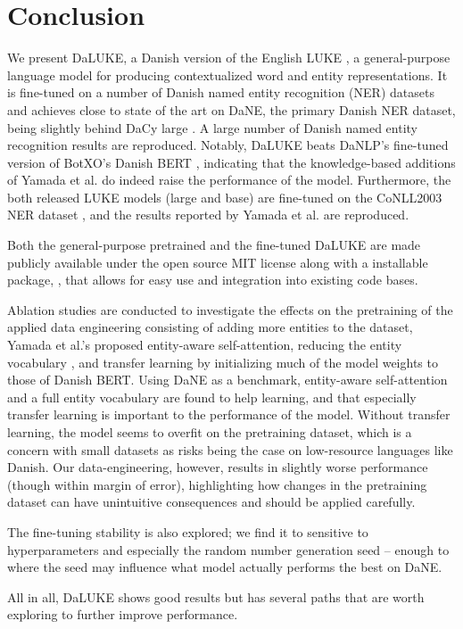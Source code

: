 \documentclass[main.tex]{subfiles}
\begin{document}
\chapter{Conclusion}
We present DaLUKE, a Danish version of the English LUKE \cite{yamada2020luke}, a general-purpose language model for producing contextualized word and entity representations.
It is fine-tuned on a number of Danish named entity recognition (NER) datasets and achieves close to state of the art on DaNE, the primary Danish NER dataset, being slightly behind DaCy large \cite{enevoldsen2020dacy}.
A large number of Danish named entity recognition results are reproduced.
Notably, DaLUKE beats DaNLP's fine-tuned version of BotXO's Danish BERT \cite{danlp2021, botxo2019dabert}, indicating that the knowledge-based additions of Yamada et al. \cite{yamada2020luke} do indeed raise the performance of the model.
Furthermore, the both released LUKE models (large and base) are fine-tuned on the CoNLL2003 NER dataset \cite{tjang2003conll}, and the results reported by Yamada et al. are reproduced.

Both the general-purpose pretrained and the fine-tuned DaLUKE are made publicly available under the open source MIT license \cite{mitlicense} along with a  installable package, , that allows for easy use and integration into existing code bases.

Ablation studies are conducted to investigate the effects on the pretraining of the applied data engineering consisting of adding more entities to the dataset, Yamada et al.'s proposed entity-aware self-attention, reducing the entity vocabulary \cite{yamada2020luke}, and transfer learning by initializing much of the model weights to those of Danish BERT.
Using DaNE as a benchmark, entity-aware self-attention and a full entity vocabulary are found to help learning, and that especially transfer learning is important to the performance of the model.
Without transfer learning, the model seems to overfit on the pretraining dataset, which is a concern with small datasets as risks being the case on low-resource languages like Danish.
Our data-engineering, however, results in slightly worse performance (though within margin of error), highlighting how changes in the pretraining dataset can have unintuitive consequences and should be applied carefully.

The fine-tuning stability is also explored; we find it to sensitive to hyperparameters and especially the random number generation seed -- enough to where the seed may influence what model actually performs the best on DaNE.

All in all, DaLUKE shows good results but has several paths that are worth exploring to further improve performance.
\end{document}

